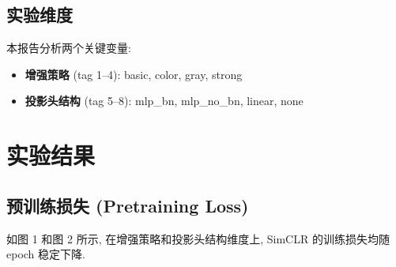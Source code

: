 \documentclass[11pt]{article}
\begin{document}
\subsection{实验维度}
本报告分析两个关键变量: 
\begin{itemize}
\item \textbf{增强策略} (tag 1--4): basic, color, gray, strong
\item \textbf{投影头结构} (tag 5--8): mlp\_bn, mlp\_no\_bn, linear, none
\end{itemize}

\section{\textbf{实验结果}}

\subsection{预训练损失 (Pretraining Loss)}
如图 1 和图 2 所示, 在增强策略和投影头结构维度上, SimCLR 的训练损失均随 epoch 稳定下降.
\end{document}
